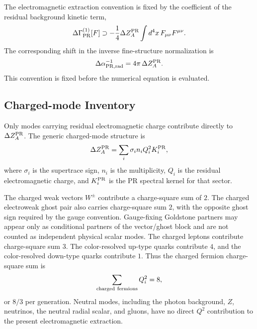 \documentclass[11pt]{article}
\begin{document}
The electromagnetic extraction convention is fixed by the coefficient of the residual background kinetic term,
\begin{equation}
\Delta\Gamma_{\rm PR}^{(1)}[F]
\supset
-\frac14\Delta Z_A^{\rm PR}
\int d^4x\,F_{\mu\nu}F^{\mu\nu}.
\end{equation}
The corresponding shift in the inverse fine-structure normalization is
\begin{equation}
\Delta\alpha_{\rm PR,rad}^{-1}
=
4\pi\,\Delta Z_A^{\rm PR}.
\label{eq:priii-alpha-radiative-shift}
\end{equation}
This convention is fixed before the numerical equation is evaluated.

\subsection{Charged-mode Inventory}
\label{subsec:priii-charged-mode-inventory}

Only modes carrying residual electromagnetic charge contribute directly to \(\Delta Z_A^{\rm PR}\).  The generic charged-mode structure is
\begin{equation}
\Delta Z_A^{\rm PR}
=
\sum_i
\sigma_i n_i Q_i^2 K_i^{\rm PR},
\label{eq:priii-charged-mode-supertrace}
\end{equation}
where \(\sigma_i\) is the supertrace sign, \(n_i\) is the multiplicity, \(Q_i\) is the residual electromagnetic charge, and \(K_i^{\rm PR}\) is the PR spectral kernel for that sector.

The charged weak vectors \(W^\pm\) contribute a charge-square sum of \(2\).  The charged electroweak ghost pair also carries charge-square sum \(2\), with the opposite ghost sign required by the gauge convention.  Gauge-fixing Goldstone partners may appear only as conditional partners of the vector/ghost block and are not counted as independent physical scalar modes.  The charged leptons contribute charge-square sum \(3\).  The color-resolved up-type quarks contribute \(4\), and the color-resolved down-type quarks contribute \(1\).  Thus the charged fermion charge-square sum is
\begin{equation}
\sum_{\rm charged\ fermions} Q_i^2 = 8,
\end{equation}
or \(8/3\) per generation.  Neutral modes, including the photon background, \(Z\), neutrinos, the neutral radial scalar, and gluons, have no direct \(Q^2\) contribution to the present electromagnetic extraction.
\end{document}
